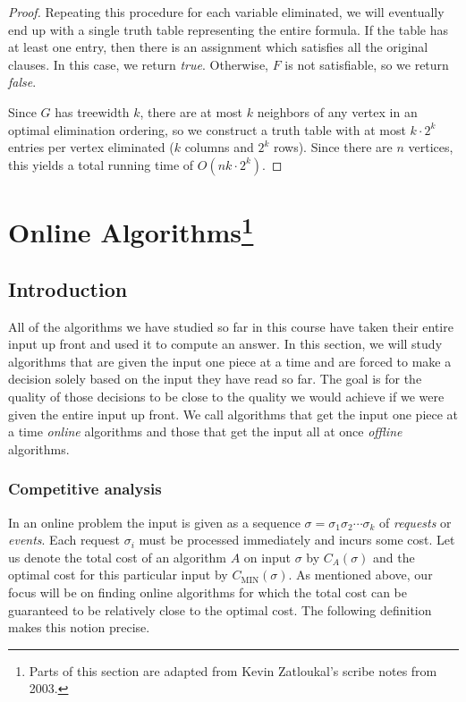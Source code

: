 \documentclass{article}
\begin{document}
\begin{proof}
Repeating this procedure for each variable eliminated, we will
eventually end up with a single truth table representing the
entire formula. If the table has at least one entry, then there is
an assignment which satisfies all the original clauses. In this
case, we return \emph{true}. Otherwise, $F$ is not satisfiable, so
we return \emph{false}.

Since $G$ has treewidth $k$, there are at most $k$ neighbors of
any vertex in an optimal elimination ordering, so we construct a
truth table with at most $k\cdot 2^k$ entries per vertex
eliminated ($k$ columns and $2^k$ rows). Since there are $n$ vertices, this yields a total
running time of $O(nk\cdot 2^k)$.
\end{proof}

\newpage

\section{Online Algorithms\footnote{Parts of this section are adapted from Kevin Zatloukal's scribe notes from 2003.}}

\subsection{Introduction}

All of the algorithms we have studied so far in this course have
taken their entire input up front and used it to compute an
answer. In this section, we will study algorithms that are given
the input one piece at a time and are forced to make a decision
solely based on the input they have read so far. The goal is for
the quality of those decisions to be close to the quality we would
achieve if we were given the entire input up front. We call
algorithms that get the input one piece at a time \emph{online}
algorithms and those that get the input all at once \emph{offline}
algorithms.

\subsubsection{Competitive analysis}

In an online problem the input is given as a sequence
$\sigma=\sigma_1\sigma_2\cdots\sigma_k$ of \emph{requests} or
\emph{events}. Each request $\sigma_i$ must be processed
immediately and incurs some cost. Let us denote the total cost of
an algorithm $A$ on input $\sigma$ by $C_A(\sigma)$ and the
optimal cost for this particular input by
$C_{\mathrm{MIN}}(\sigma)$. As mentioned above, our focus will be
on finding online algorithms for which the total cost can be
guaranteed to be relatively close to the optimal cost. The
following definition makes this notion precise.
\end{document}
